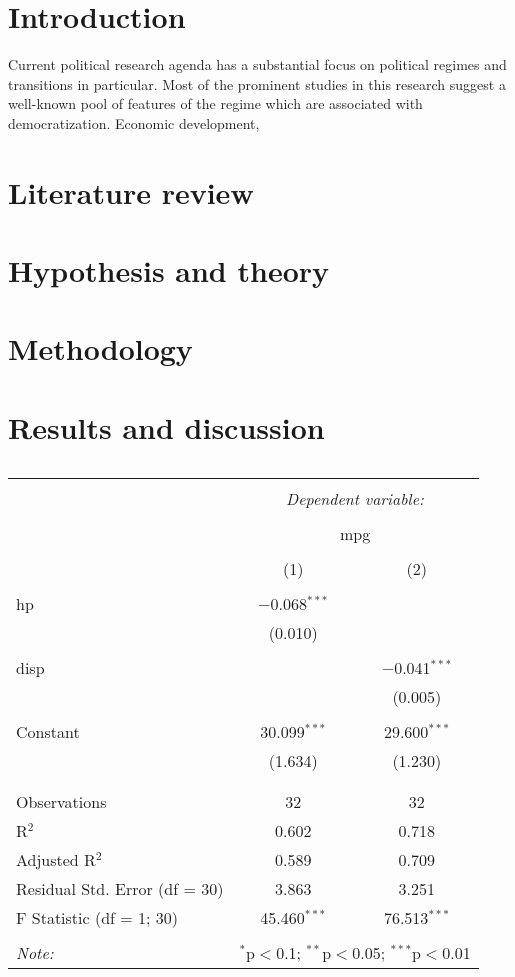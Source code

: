 \documentclass[a4paper, 11pt]{article}
\begin{document}
\section*{Introduction}
Current political research agenda has a substantial focus on political regimes and transitions in particular. Most of the prominent studies in this research suggest a well-known pool of features of the regime which are associated with democratization. Economic development, 
\section*{Literature review}
\section*{Hypothesis and theory}
\section*{Methodology}
\section*{Results and discussion}




\begin{table}[!htbp] \centering 
  \caption{} 
  \label{} 
\begin{tabular}{@{\extracolsep{5pt}}lcc} 
\\[-1.8ex]\hline 
\hline \\[-1.8ex] 
 & \multicolumn{2}{c}{\textit{Dependent variable:}} \\ 
\cline{2-3} 
\\[-1.8ex] & \multicolumn{2}{c}{mpg} \\ 
\\[-1.8ex] & (1) & (2)\\ 
\hline \\[-1.8ex] 
 hp & $-$0.068$^{***}$ &  \\ 
  & (0.010) &  \\ 
  & & \\ 
 disp &  & $-$0.041$^{***}$ \\ 
  &  & (0.005) \\ 
  & & \\ 
 Constant & 30.099$^{***}$ & 29.600$^{***}$ \\ 
  & (1.634) & (1.230) \\ 
  & & \\ 
\hline \\[-1.8ex] 
Observations & 32 & 32 \\ 
R$^{2}$ & 0.602 & 0.718 \\ 
Adjusted R$^{2}$ & 0.589 & 0.709 \\ 
Residual Std. Error (df = 30) & 3.863 & 3.251 \\ 
F Statistic (df = 1; 30) & 45.460$^{***}$ & 76.513$^{***}$ \\ 
\hline 
\hline \\[-1.8ex] 
\textit{Note:}  & \multicolumn{2}{r}{$^{*}$p$<$0.1; $^{**}$p$<$0.05; $^{***}$p$<$0.01} \\ 
\end{tabular} 
\end{table} 
\end{document}
